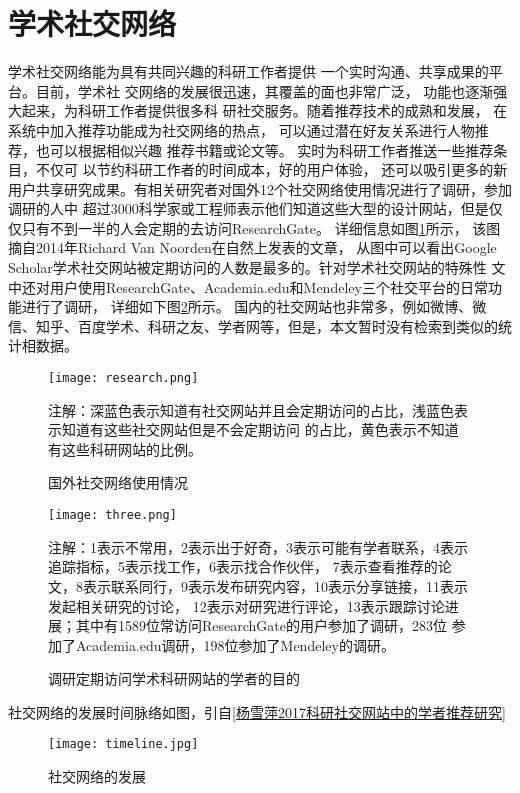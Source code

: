 \section{学术社交网络}
学术社交网络能为具有共同兴趣的科研工作者提供%
一个实时沟通、共享成果的平台。目前，学术社%
交网络的发展很迅速，其覆盖的面也非常广泛，%
功能也逐渐强大起来，为科研工作者提供很多科%
研社交服务。随着推荐技术的成熟和发展，%
在系统中加入推荐功能成为社交网络的热点，%
可以通过潜在好友关系进行人物推荐，也可以根据相似兴趣%
推荐书籍或论文等。
实时为科研工作者推送一些推荐条目，不仅可%
以节约科研工作者的时间成本，好的用户体验，%
还可以吸引更多的新用户共享研究成果。有相关研究者对国外12个社交网络使用情况进行了调研，参加调研的人中%
超过3000科学家或工程师表示他们知道这些大型的设计网站，但是仅仅只有不到一半的人会定期的去访问ResearchGate。%
详细信息如图\ref{fig:research}所示，%
该图摘自2014年Richard Van Noorden在自然上发表的文章，
从图中可以看出Google Scholar学术社交网站被定期访问的人数是最多的。针对学术社交网站的特殊性%
文中还对用户使用ResearchGate、Academia.edu和Mendeley三个社交平台的日常功能进行了调研，%
详细如下图\ref{fig:three}所示。
国内的社交网站也非常多，例如微博、微信、知乎、百度学术、科研之友、学者网等，但是，本文暂时没有检索到类似的统计相数据。
\begin{figure}[htbp] %
  \centering
  \texttt{[image: research.png]}
  \caption{国外社交网络使用情况}
  \label{fig:research}
  \footnotesize
  注解：深蓝色表示知道有社交网站并且会定期访问的占比，浅蓝色表示知道有这些社交网站但是不会定期访问%
  的占比，黄色表示不知道有这些科研网站的比例。
\end{figure}
\begin{figure}[htbp] %
  \centering
  \texttt{[image: three.png]}
  \caption{调研定期访问学术科研网站的学者的目的}
  \label{fig:three}
  \footnotesize
  注解：1表示不常用，2表示出于好奇，3表示可能有学者联系，4表示追踪指标，5表示找工作，6表示找合作伙伴，%
  7表示查看推荐的论文，8表示联系同行，9表示发布研究内容，10表示分享链接，11表示发起相关研究的讨论，%
  12表示对研究进行评论，13表示跟踪讨论进展；其中有1589位常访问ResearchGate的用户参加了调研，283位%
  参加了Academia.edu调研，198位参加了Mendeley的调研。
\end{figure}

社交网络的发展时间脉络如图，引自\ref{杨雪萍2017科研社交网站中的学者推荐研究}
\begin{figure}[htbp] %
  \centering
  \texttt{[image: timeline.jpg]}
  \caption{社交网络的发展}
  \label{fig:academic_time}
\end{figure}

